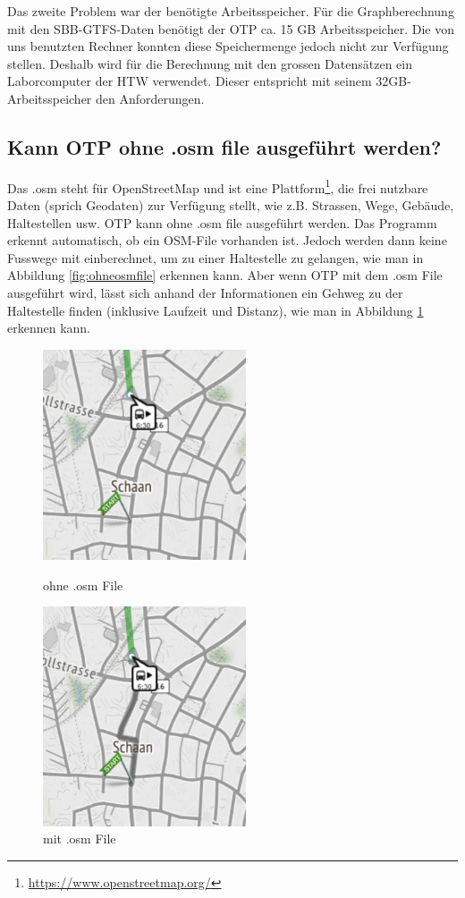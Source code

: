 Das zweite Problem war der benötigte Arbeitsspeicher. Für die Graphberechnung mit den SBB-GTFS-Daten benötigt der OTP ca. 15 GB Arbeitsspeicher. Die von uns benutzten Rechner konnten diese Speichermenge jedoch nicht zur Verfügung stellen. Deshalb wird für die Berechnung mit den grossen Datensätzen ein Laborcomputer der HTW verwendet. Dieser entspricht mit seinem 32GB-Arbeitsspeicher den Anforderungen.


\subsection{Kann OTP ohne .osm file ausgeführt werden?}
Das .osm steht für OpenStreetMap und ist eine Plattform\footnote{\url{https://www.openstreetmap.org/}}, die frei nutzbare Daten (sprich Geodaten) zur Verfügung stellt, wie z.B. Strassen, Wege, Gebäude, Haltestellen usw. OTP kann ohne .osm file ausgeführt werden. Das Programm erkennt automatisch, ob ein OSM-File vorhanden ist. Jedoch werden dann keine Fusswege mit einberechnet, um zu einer Haltestelle zu gelangen, wie man in Abbildung \ref{fig:ohneosmfile} erkennen kann.
Aber wenn OTP mit dem .osm File ausgeführt wird, lässt sich anhand der Informationen ein Gehweg zu der Haltestelle finden (inklusive Laufzeit und Distanz), wie man in Abbildung \ref{fig:mitosmfile} erkennen kann. 

\begin{figure}[htb]
	\centering
	\begin{minipage}{0.45\linewidth}
		\centering
		\includegraphics[width=6cm]{img/ohneosmfile.png}
		\caption{ohne .osm File}
		\label{fig:ohneosmfile}
	\end{minipage}
	\begin{minipage}{0.45\linewidth}
		\centering
		\includegraphics[width=6cm]{img/mitosmfile.png}
		\caption{mit .osm File}
		\label{fig:mitosmfile}
	\end{minipage}
\end{figure}





